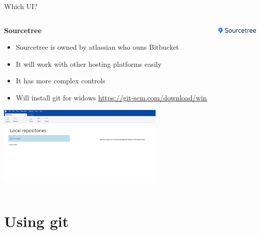 \documentclass[10pt]{beamer}
\begin{document}
{\begin{frame}[fragile]{Which UI?}
\begin{columns}[T]
\begin{column}{.8\textwidth}
\textbf{Sourcetree\\}
\begin{itemize}
\item Sourcetree is owned by atlassian who ouns Bitbucket
\item It will work with other hosting platforms easily
\item It has more complex controls
\item Will install git for widows \url{https://git-scm.com/download/win}
\end{itemize}
\includegraphics[width=8cm]{Figs/ST/ST_00} 
\end{column}
\begin{column}{.2\textwidth}
\includegraphics[width=2cm]{Figs/git/Sourcetree} \newline \newline \newline 
\end{column}
\end{columns}
\end{frame}


\section{Using git}


}
\end{document}

